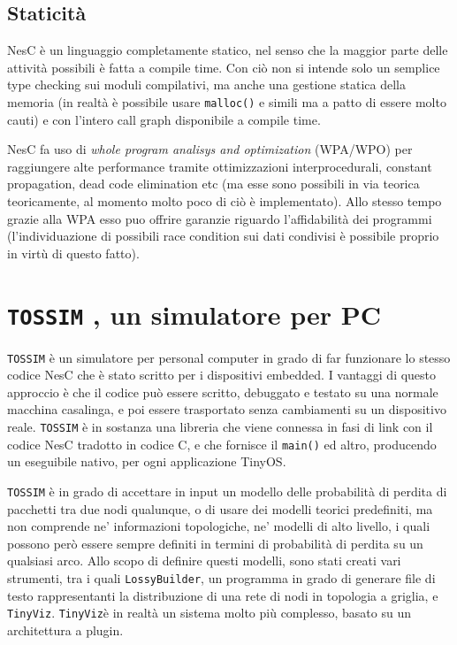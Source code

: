 \documentclass[twoside,11pt,a4paper,italian,openany]{book}
\begin{document}
\subsection{Staticità}

NesC è un linguaggio completamente statico, nel senso che la maggior parte delle attività 
possibili è fatta a compile time. Con ciò non si intende solo un semplice type checking sui 
moduli compilativi, ma anche una gestione statica della memoria (in realtà è possibile usare 
\texttt{malloc()} e simili ma a patto di essere molto cauti) e con l'intero call graph disponibile a compile time. 

NesC fa uso di \emph{whole program analisys and optimization} (WPA/WPO) per raggiungere alte
performance tramite ottimizzazioni interprocedurali, constant propagation, dead code 
elimination etc (ma esse sono possibili in via teorica teoricamente, al momento molto poco 
di ciò è implementato).
Allo stesso tempo grazie alla WPA esso puo offrire garanzie riguardo l'affidabilità dei 
programmi (l'individuazione di possibili race condition sui dati condivisi è possibile proprio 
in virtù di questo fatto).


\newcommand{\tos}{\texttt{TOSSIM} }

\section{\tos, un simulatore per PC}
\tos\cite{TOSSIM} è un simulatore per personal computer  in grado di far funzionare lo 
stesso codice NesC che è stato scritto per i dispositivi embedded. 
I vantaggi di questo approccio è che il codice può essere scritto, debuggato e testato su 
una normale macchina casalinga, e poi essere trasportato senza cambiamenti su un dispositivo 
reale. 
\tos è in sostanza una libreria che viene connessa in fasi di link con il codice NesC 
tradotto in codice C, e che fornisce il \texttt{main()} ed altro, producendo un 
eseguibile nativo, per ogni applicazione TinyOS.

\tos è in grado di accettare in input un modello delle probabilità di perdita di pacchetti 
tra due nodi qualunque, o di usare dei modelli teorici predefiniti, ma non comprende ne' 
informazioni topologiche, ne' modelli di alto livello, i quali possono però essere sempre 
definiti in termini di probabilità di perdita su un qualsiasi arco.
\newcommand{\tv}{\texttt{TinyViz}}
Allo scopo di definire questi modelli, sono stati creati vari strumenti, tra i quali 
\texttt{LossyBuilder}, un programma in grado di generare file di testo rappresentanti 
la distribuzione di una rete di nodi in topologia a griglia, e \tv.
\tv è in realtà un sistema molto più complesso, basato su un architettura a plugin. 
\end{document}
